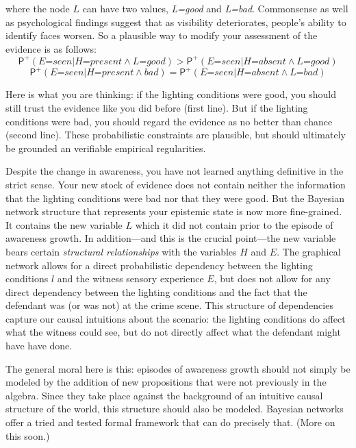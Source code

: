 \documentclass[
  11pt,
  dvipsnames,enabledeprecatedfontcommands]{scrartcl}
\newcommand{\ppr}[2]{\ensuremath{\mathsf{P}^{#1}(#2)}}
\begin{document}
\noindent where the node \(L\) can have two values, \textit{L=good} and
\textit{L=bad}. Commonsense as well as psychological findings suggest
that as visibility deteriorates, people's ability to identify faces
worsen. So a plausible way to modify your assessment of the evidence is
as follows:
\[\ppr{+}{\textit{E=seen} \vert \textit{H=present} \wedge \textit{L=good}} > \ppr{+}{\textit{E=seen} \vert \textit{H=absent} \wedge \textit{L=good}}\]
\[\ppr{+}{\textit{E=seen} \vert \textit{H=present} \wedge \textit{bad}} = \ppr{+}{\textit{E=seen} \vert \textit{H=absent} \wedge \textit{L=bad}}\]

\noindent Here is what you are thinking: if the lighting conditions were
good, you should still trust the evidence like you did before (first
line). But if the lighting conditions were bad, you should regard the
evidence as no better than chance (second line). These probabilistic
constraints are plausible, but should ultimately be grounded an
verifiable empirical regularities.

Despite the change in awareness, you have not learned anything
definitive in the strict sense. Your new stock of evidence does not
contain neither the information that the lighting conditions were bad
nor that they were good. But the Bayesian network structure that
represents your epistemic state is now more fine-grained. It contains
the new variable \(L\) which it did not contain prior to the episode of
awareness growth. In addition---and this is the crucial point---the new
variable bears certain \emph{structural relationships} with the
variables \(H\) and \(E\). The graphical network allows for a direct
probabilistic dependency between the lighting conditions \(l\) and the
witness sensory experience \(E\), but does not allow for any direct
dependency between the lighting conditions and the fact that the
defendant was (or was not) at the crime scene. This structure of
dependencies capture our causal intuitions about the scenario: the
lighting conditions do affect what the witness could see, but do not
directly affect what the defendant might have have done.

The general moral here is this: episodes of awareness growth should not
simply be modeled by the addition of new propositions that were not
previously in the algebra. Since they take place against the background
of an intuitive causal structure of the world, this structure should
also be modeled. Bayesian networks offer a tried and tested formal
framework that can do precisely that. (More on this soon.)
\end{document}

